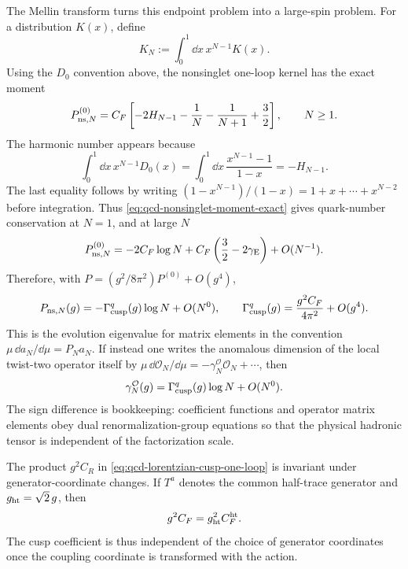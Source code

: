 The Mellin transform turns this endpoint problem into a large-spin problem.
For a distribution \(K(x)\), define
\[
  K_N:=\int_0^1\dd x\,x^{N-1}K(x).
\]
Using the \(D_0\) convention above, the nonsinglet one-loop kernel has the
exact moment
\begin{equation}
  P_{{\rm ns},N}^{(0)}
  =
  C_F\left[
    -2H_{N-1}-\frac1N-\frac1{N+1}+\frac32
  \right],
  \qquad N\ge1 .
  \label{eq:qcd-nonsinglet-moment-exact}
\end{equation}
The harmonic number appears because
\begin{equation}
  \int_0^1\dd x\,x^{N-1}D_0(x)
  =
  \int_0^1\dd x\,
  \frac{x^{N-1}-1}{1-x}
  =
  -H_{N-1}.
  \label{eq:qcd-d0-mellin-harmonic}
\end{equation}
The last equality follows by writing
\((1-x^{N-1})/(1-x)=1+x+\cdots+x^{N-2}\) before integration.  Thus
\eqref{eq:qcd-nonsinglet-moment-exact} gives quark-number conservation at
\(N=1\), and at large \(N\)
\begin{equation}
  P_{{\rm ns},N}^{(0)}
  =
  -2C_F\log N
  +C_F\left(\frac32-2\gamma_{\rm E}\right)
  +O(N^{-1}).
  \label{eq:qcd-nonsinglet-large-n}
\end{equation}
Therefore, with \(P=(g^2/8\pi^2)P^{(0)}+O(g^4)\),
\begin{equation}
  P_{{\rm ns},N}(g)
  =
  -\Gamma_{\rm cusp}^q(g)\log N+O(N^0),
  \qquad
  \Gamma_{\rm cusp}^q(g)
  =
  \frac{g^2C_F}{4\pi^2}+O(g^4).
  \label{eq:qcd-large-spin-dglap-cusp}
\end{equation}
This is the evolution eigenvalue for matrix elements in the convention
\(\mu\,\dd a_N/\dd\mu=P_Na_N\).  If instead one writes the anomalous dimension
of the local twist-two operator itself by
\(\mu\,\dd\mathcal O_N/\dd\mu=-\gamma_N^{\mathcal O}\mathcal O_N+\cdots\),
then
\[
  \gamma_N^{\mathcal O}(g)
  =
  \Gamma_{\rm cusp}^q(g)\log N+O(N^0).
\]
The sign difference is bookkeeping: coefficient functions and operator
matrix elements obey dual renormalization-group equations so that the
physical hadronic tensor is independent of the factorization scale.

The product \(g^2C_R\) in
\eqref{eq:qcd-lorentzian-cusp-one-loop} is invariant under generator-coordinate
changes.  If \(T^a\) denotes the common half-trace generator and
\(g_{\rm ht}=\sqrt2\,g\), then
\[
  g^2C_F=g_{\rm ht}^2C_F^{\rm ht}.
\]
The cusp coefficient is thus independent of the choice of generator
coordinates once the coupling coordinate is transformed with the action.


